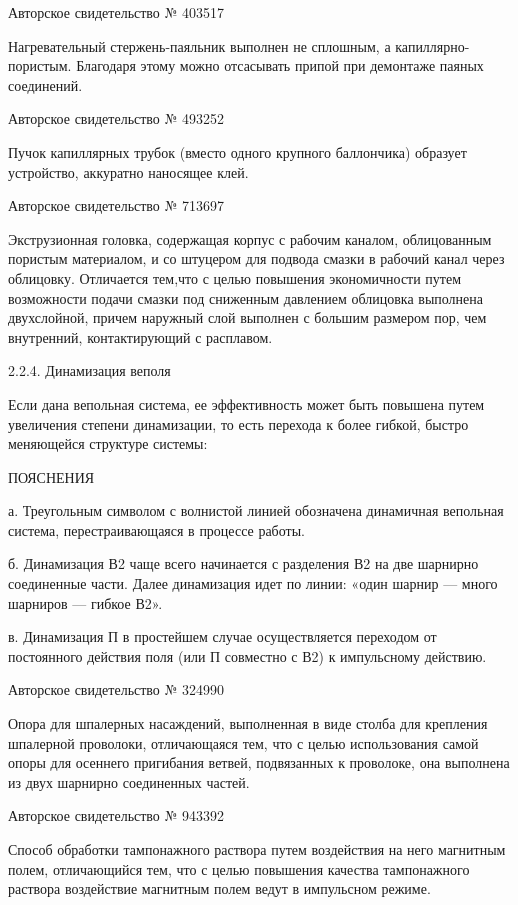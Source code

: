 Авторское свидетельство № 403517

Нагревательный    стержень-паяльник    выполнен   не    сплошным,    а
капиллярно-пористым.  Благодаря  этому  можно  отсасывать  припой  при
демонтаже паяных соединений.


Авторское свидетельство № 493252

Пучок капиллярных трубок (вместо  одного крупного баллончика) образует
устройство, аккуратно наносящее клей.


Авторское свидетельство № 713697

Экструзионная   головка,   содержащая   корпус  с   рабочим   каналом,
облицованным пористым материалом,  и со штуцером для  подвода смазки в
рабочий канал  через облицовку.  Отличается тем,что с  целью повышения
экономичности путем возможности подачи  смазки под сниженным давлением
облицовка  выполнена  двухслойной,  причем наружный  слой  выполнен  с
большим размером пор, чем внутренний, контактирующий с расплавом.


2.2.4. Динамизация веполя

Если  дана вепольная  система,  ее эффективность  может быть  повышена
путем увеличения степени динамизации, то есть перехода к более гибкой,
быстро меняющейся структуре системы:


ПОЯСНЕНИЯ

а.  Треугольным  символом  с волнистой  линией  обозначена  динамичная
вепольная система, перестраивающаяся в процессе работы.

б.  Динамизация  В2 чаще  всего  начинается  с  разделения В2  на  две
шарнирно  соединенные части.  Далее динамизация  идет по  линии: «один
шарнир — много шарниров — гибкое В2».

в.  Динамизация  П в  простейшем  случае  осуществляется переходом  от
постоянного  действия  поля  (или  П совместно  с  В2)  к  импульсному
действию.


Авторское свидетельство № 324990

Опора  для  шпалерных  насаждений,   выполненная  в  виде  столба  для
крепления  шпалерной   проволоки,  отличающаяся   тем,  что   с  целью
использования самой опоры для  осеннего пригибания ветвей, подвязанных
к проволоке, она выполнена из двух шарнирно соединенных частей.


Авторское свидетельство № 943392

Способ  обработки  тампонажного  раствора путем  воздействия  на  него
магнитным  полем, отличающийся  тем,  что с  целью повышения  качества
тампонажного раствора  воздействие магнитным полем ведут  в импульсном
режиме.

